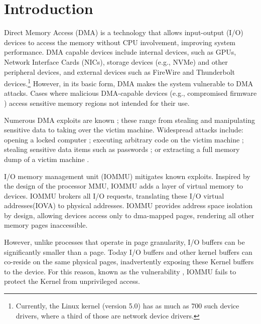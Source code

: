 \section{Introduction}

Direct Memory Access (DMA) is a technology that allows input-output (I/O) devices to access the memory without CPU involvement, improving system performance.
DMA capable devices include internal devices, such as GPUs, Network Interface Cards (NICs), storage devices (e.g., NVMe) and other peripheral devices, and external devices such as FireWire and Thunderbolt devices.\footnote{Currently, the Linux kernel (version 5.0) has as much as 700 such device drivers, where a third of those are network device drivers.} However, in its basic form, DMA makes the system vulnerable to DMA attacks. Cases where malicious DMA-capable devices (e.g., compromised firmware \cite{Gal14,Ben17a}) access sensitive memory regions not intended for their use. 


Numerous DMA exploits are known \cite{Dor04,BDK10,thunder}; these range from stealing and manipulating sensitive data to taking over the victim machine. Widespread attacks include: opening a locked computer \cite{MM, Fin14}; executing arbitrary code on the victim machine \cite{Fri16, Woj08, AD10,thunder}; stealing sensitive data items such as passwords \cite{SB12, LKV13, Cim16, BR12}; or extracting a full memory dump of a victim machine \cite{MM, Vol, Fin14, GA10}. 

I/O memory management unit (IOMMU) mitigates known exploits. Inspired by the design of the processor MMU, IOMMU adds a layer of virtual memory to devices. IOMMU brokers all I/O requests, translating these I/O virtual addresses(IOVA) to physical addresses. IOMMU provides address space isolation by design, allowing devices access only to dma-mapped pages, rendering all other memory pages inaccessible.

However, unlike processes that operate in page granularity, I/O buffers can be significantly smaller than a page. Today I/O buffers and other kernel buffers can co-reside on the same physical pages, inadvertently exposing these Kernel buffers to the device. For this reason, known as the \subpage{} vulnerability \cite{MMT16,thunder}, IOMMU fails to protect the Kernel from unprivileged access. 

